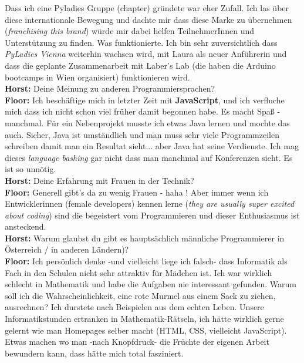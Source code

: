 Dass ich eine Pyladies Gruppe (chapter) gründete war eher Zufall. Ich las über diese internationale Bewegung und dachte mir dass diese Marke zu übernehmen (\textit{franchising this brand}) würde mir dabei helfen TeilnehmerInnen und Unterstützung zu finden. Was funktionierte.
Ich bin sehr zuversichtlich dass \textit{PyLadies Vienna} weiterhin wachsen wird, mit Laura als neuer Anführerin und dass die geplante Zusammenarbeit mit Laber's Lab (die haben die Arduino bootcamps in Wien organisiert) funktionieren wird. \\
\textbf{Horst:} Deine Meinung zu anderen Programmiersprachen? \\
\textbf{Floor:} Ich beschäftige mich in letzter Zeit mit \textbf{JavaScript}, und ich verfluche mich dass ich nicht schon viel früher damit begonnen habe. Es macht Spaß - manchmal. Für ein Nebenprojekt musste ich etwas Java lernen und mochte das auch. Sicher, Java ist umständlich und man muss sehr viele Programmzeilen schreiben damit man ein Resultat sieht... aber Java hat seine Verdienste. Ich mag dieses \textit{language bashing} gar nicht dass man manchmal auf Konferenzen sieht. Es ist so unnötig. \\
\textbf{Horst:} Deine Erfahrung mit Frauen in der Technik? \\
\textbf{Floor:} Generell gibt's da zu wenig Frauen - haha ! Aber immer wenn ich Entwicklerinnen (female developers) kennen lerne (\textit{they are usually super excited about coding}) sind die begeistert vom Programmieren und dieser Enthusiasmus ist ansteckend. \\
\textbf{Horst:} Warum glaubst du gibt es hauptsächlich männliche Programmierer in Österreich / in anderen Ländern)? \\
\textbf{Floor:} Ich persönlich denke -und vielleicht liege ich falsch- dass Informatik als Fach in den Schulen nicht sehr attraktiv für Mädchen ist. Ich war wirklich schlecht in Mathematik und habe die Aufgaben nie interessant gefunden. Warum soll ich die Wahrscheinlichkeit, eine rote Murmel aus einem Sack zu ziehen, ausrechnen? Ich durstete nach Beispielen aus dem echten Leben. Unsere Informatikstunden ertranken in Mathematik-Rätseln, ich hätte wirklich gerne gelernt wie man Homepages selber macht (HTML, CSS, vielleicht JavaScript). Etwas machen wo man -nach Knopfdruck- die Früchte der eigenen Arbeit bewundern kann, dass hätte mich total fasziniert. 

